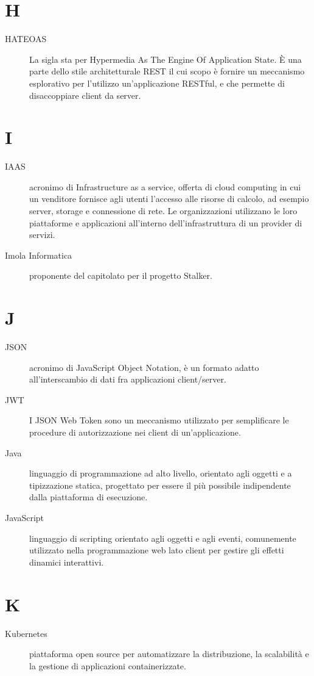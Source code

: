 \documentclass{article}
\begin{document}
\section{H}
\begin{description}
  \item[HATEOAS] La sigla sta per Hypermedia As The Engine Of Application State. È una parte dello stile architetturale REST il cui scopo è fornire un meccanismo esplorativo per l'utilizzo un'applicazione RESTful, e che permette di disaccoppiare client da server.
\end{description}
\newpage
\section{I}
\begin{description}
  \item[IAAS] acronimo di Infrastructure as a service, offerta di cloud computing in cui un venditore fornisce agli utenti l'accesso alle risorse di calcolo, ad esempio server, storage e connessione di rete. Le organizzazioni utilizzano le loro piattaforme e applicazioni all'interno dell'infrastruttura di un provider di servizi.
  \item[Imola Informatica] proponente del capitolato per il progetto Stalker.
\end{description}
\newpage
\section{J}
\begin{description}
  \item[JSON] acronimo di JavaScript Object Notation, è un formato adatto all'interscambio di dati fra applicazioni client/server.
  \item[JWT] I JSON Web Token sono un meccanismo utilizzato per semplificare le procedure di autorizzazione nei client di un'applicazione.
  \item[Java] linguaggio di programmazione ad alto livello, orientato agli oggetti e a tipizzazione statica, progettato per essere il più possibile indipendente dalla piattaforma di esecuzione.
  \item[JavaScript] linguaggio di scripting orientato agli oggetti e agli eventi, comunemente utilizzato nella programmazione web lato client per gestire gli effetti dinamici interattivi.
\end{description}
\newpage
\section{K}
\begin{description}
  \item[Kubernetes] piattaforma open source per automatizzare la distribuzione, la scalabilità e la gestione di applicazioni containerizzate.
\end{description}
\newpage
\end{document}
